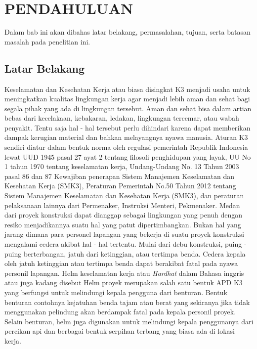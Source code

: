 \section{PENDAHULUAN}
\label{chap:pendahuluan}


Dalam bab ini akan dibahas latar belakang, permasalahan, tujuan, serta batasan masalah pada penelitian ini.

\subsection{Latar Belakang}
\label{sec:latarbelakang}

Keselamatan dan Kesehatan Kerja atau biasa disingkat K3 menjadi usaha untuk meningkatkan kualitas lingkungan kerja agar menjadi lebih aman dan sehat bagi segala pihak yang ada di lingkungan tersebut. Aman dan sehat bisa dalam artian bebas dari kecelakaan, kebakaran, ledakan, lingkungan tercemar, atau wabah penyakit. Tentu saja hal - hal tersebut perlu dihindari karena dapat memberikan dampak kerugian material dan bahkan melayangnya nyawa manusia. Aturan K3 sendiri diatur dalam bentuk norma oleh regulasi pemerintah Republik Indonesia lewat UUD 1945 pasal 27 ayat 2 tentang filosofi penghidupan yang layak, UU No 1 tahun 1970 tentang keselamatan kerja, Undang-Undang No. 13 Tahun 2003 pasal 86 dan 87 Kewajiban penerapan Sistem Manajemen Keselamatan dan Kesehatan Kerja (SMK3), Peraturan Pemerintah No.50 Tahun 2012 tentang Sistem Manajemen Keselamatan dan Kesehatan Kerja (SMK3), dan peraturan pelaksanaan lainnya dari Permenaker, Instruksi Menteri, Pekmenaker.  \cite{ahlik3umum-k3indonesia_2021}
Medan dari proyek konstruksi dapat dianggap sebagai lingkungan yang penuh dengan resiko menjadikannya suatu hal yang patut dipertimbangkan. Bukan hal yang jarang dimana para personel lapangan yang bekerja di suatu proyek konstruksi mengalami cedera akibat hal - hal tertentu. Mulai dari debu konstruksi, puing - puing berterbangan, jatuh dari ketinggian, atau tertimpa benda. Cedera kepala oleh jatuh ketinggian atau tertimpa benda dapat berakibat fatal pada nyawa personil lapangan. \cite{li2020deep}
Helm keselamatan kerja atau \emph{Hardhat} dalam Bahasa inggris atau juga kadang disebut Helm proyek merupakan salah satu bentuk APD K3 yang berfungsi untuk melindungi kepala pengguna dari benturan. Bentuk benturan contohnya kejatuhan benda tajam atau berat yang sekiranya jika tidak menggunakan pelindung akan berdampak fatal pada kepala personil proyek. Selain benturan, helm juga digunakan untuk melindungi kepala penggunanya dari percikan api dan berbagai bentuk serpihan terbang yang biasa ada di lokasi kerja.\cite{k3_mutiaramutu}
